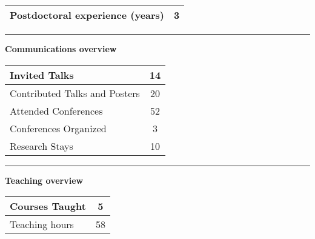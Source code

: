 \documentclass[a4paper]{article}
\newcommand{\block}[1]{\hrule \vspace{0.2cm} \textbf{\Large #1} \vspace{0.2cm}}
\begin{document}
\begin{minipage}[t]{0.375\columnwidth}
\begin{tabularx}{\linewidth}{|X|c|}
    Postdoctoral experience (years) & 3 \\
    \hline
    
    \end{tabularx}
    \vspace{1em}





    \block{Communications overview} 
    
    \begin{tabularx}{\linewidth}{|X|c|}
    \hline
    
    Invited Talks & 14 \\
    \hline
    
    Contributed Talks and Posters & 20 \\
    \hline
    
    Attended Conferences & 52 \\
    \hline
    
    Conferences Organized & 3 \\
    \hline
    
    Research Stays & 10 \\
    \hline
    
    \end{tabularx}
    \vspace{1em}





    \block{Teaching overview} 
    
    \begin{tabularx}{\linewidth}{|X|c|}
    \hline
    
    Courses Taught & 5 \\
    \hline
    
    Teaching hours & 58 \\
    \hline
    
    \end{tabularx}
    \vspace{1em}




\end{minipage}
\end{document}
